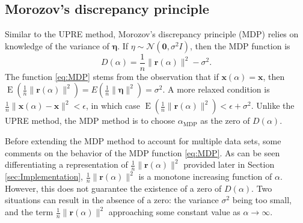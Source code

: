 \documentclass[12pt]{article}
\newcommand{\rVec}{\mathbf{r}}	%
\newcommand{\xVec}{\mathbf{x}}	%
\newcommand{\regparam}{\alpha}
\newcommand{\xReg}{\xVec(\regparam)}	%
\newcommand{\noise}{\eta}	%
\newcommand{\noiseSD}{\sigma}	%
\newcommand{\noiseVec}{\bm{\noise}}	%
\DeclareMathOperator{\E}{E}	%
\newcommand{\D}{D}	%
\newcommand{\MDP}{\text{MDP}}	%
\begin{document}
\subsection{Morozov's discrepancy principle} \label{sec:MDP}
Similar to the UPRE method, Morozov's discrepancy principle (MDP) \cite{Morozov1966} relies on knowledge of the variance of $\noiseVec$. If $\noise \sim \mathcal{N}(\bm{0},\noiseSD^2I)$, then the MDP function is 
\begin{equation}
\label{eq:MDP}
\D(\regparam) = \frac{1}{n}\|\rVec(\regparam)\|^2 - \noiseSD^2.
\end{equation}
The function \eqref{eq:MDP} stems from the observation that if $\xReg = \xVec$, then $\E(\frac{1}{n}\|\rVec(\regparam)\|^2) = E(\frac{1}{n}\|\noiseVec\|^2) = \noiseSD^2$. A more relaxed condition is $\frac{1}{n}\|\xReg - \xVec\|^2 < \epsilon$, in which case $\E(\frac{1}{n}\|\rVec(\regparam)\|^2) < \epsilon + \noiseSD^2$. Unlike the UPRE method, the MDP method is to choose $\regparam_{\MDP}$ as the zero of $\D(\regparam)$.  \par 
Before extending the MDP method to account for multiple data sets, some comments on the behavior of the MDP function \eqref{eq:MDP}. As can be seen differentiating a representation of $\frac{1}{n}\|\rVec(\regparam)\|^2$ provided later in Section \ref{sec:Implementation}, $\frac{1}{n}\|\rVec(\regparam)\|^2$ is a monotone increasing function of $\regparam$. However, this does not guarantee the existence of a zero of $\D(\regparam)$. Two situations can result in the absence of a zero: the variance $\noiseSD^2$ being too small, and the term $\frac{1}{n}\|\rVec(\regparam)\|^2$ approaching some constant value as $\regparam \rightarrow \infty$.
\end{document}
